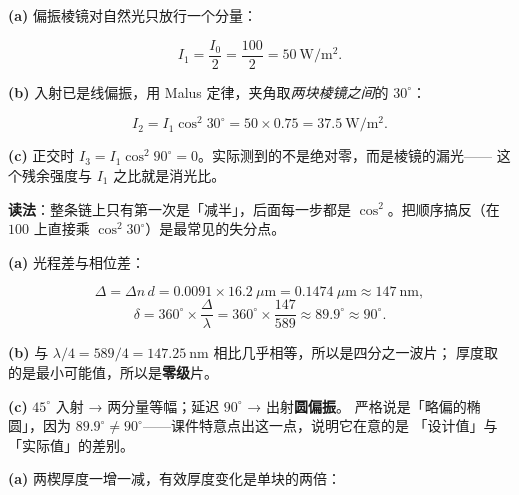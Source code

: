 \documentclass[11pt]{ctexart}
\let\subhdrtheme\subhdr
\renewcommand{\subhdr}[1]{\needspace{3\baselineskip}\subhdrtheme{#1}}
\begin{document}


\textbf{(a)} 偏振棱镜对自然光只放行一个分量：

\[
I_1=\frac{I_0}{2}=\frac{100}{2}=50\ \mathrm{W/m^2}.
\]

\textbf{(b)} 入射已是线偏振，用 Malus 定律，夹角取\emph{两块棱镜之间}的 $30^\circ$：

\[
I_2=I_1\cos^2 30^\circ=50\times0.75=37.5\ \mathrm{W/m^2}.
\]

\textbf{(c)} 正交时 $I_3=I_1\cos^2 90^\circ=0$。实际测到的不是绝对零，而是棱镜的漏光——
这个残余强度与 $I_1$ 之比就是消光比。

\textbf{读法}：整条链上只有第一次是「减半」，后面每一步都是 $\cos^2$。把顺序搞反（在 $100$ 上直接乘
$\cos^2 30^\circ$）是最常见的失分点。



\textbf{(a)} 光程差与相位差：

\[
\Delta=\Delta n\,d=0.0091\times16.2\ \mu\mathrm{m}=0.1474\ \mu\mathrm{m}\approx147\ \mathrm{nm},
\]
\[
\delta=360^\circ\times\frac{\Delta}{\lambda}=360^\circ\times\frac{147}{589}\approx89.9^\circ\approx90^\circ .
\]

\textbf{(b)} 与 $\lambda/4=589/4=147.25\ \mathrm{nm}$ 相比几乎相等，所以是四分之一波片；
厚度取的是最小可能值，所以是\textbf{零级}片。

\textbf{(c)} $45^\circ$ 入射 → 两分量等幅；延迟 $90^\circ$ → 出射\textbf{圆偏振}。
严格说是「略偏的椭圆」，因为 $89.9^\circ\ne90^\circ$——课件特意点出这一点，说明它在意的是
「设计值」与「实际值」的差别。



\textbf{(a)} 两楔厚度一增一减，有效厚度变化是单块的两倍：
\end{document}
